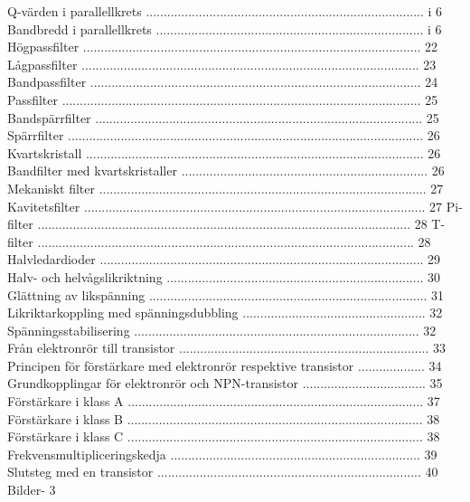 Q-värden i parallellkrets ............................................................................... i 6
Bandbredd i parallellkrets ............................................................................ i 6
Högpassfilter ................................................................................................ 22
Lågpassfilter ................................................................................................ 23
Bandpassfilter .............................................................................................. 24
Passfilter ...................................................................................................... 25
Bandspärrfilter ............................................................................................. 25
Spärrfilter ..................................................................................................... 26
Kvartskristall ................................................................................................ 26
Bandfilter med kvartskristaller ...................................................................... 26
Mekaniskt filter ............................................................................................. 27
Kavitetsfilter ................................................................................................. 27
Pi-filter .......................................................................................................... 28
T-filter ........................................................................................................... 28
Halvledardioder ............................................................................................ 29
Halv- och helvågslikriktning ......................................................................... 30
Glättning av likspänning ............................................................................... 31
Likriktarkoppling med spänningsdubbling .................................................... 32
Spänningsstabilisering ................................................................................. 32
Från elektronrör till transistor ....................................................................... 33
Principen för förstärkare med elektronrör respektive transistor ................... 34
Grundkopplingar för elektronrör och NPN-transistor ................................... 35
Förstärkare i klass A .................................................................................... 37
Förstärkare i klass B .................................................................................... 38
Förstärkare i klass C .................................................................................... 38
Frekvensmultipliceringskedja ....................................................................... 39
Slutsteg med en transistor ........................................................................... 40
Bilder- 3


